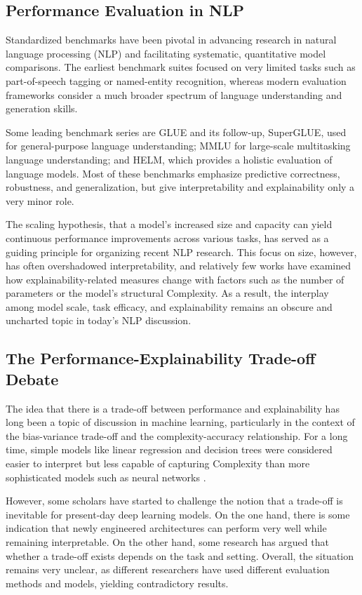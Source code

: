 \documentclass[preprint,12pt]{elsarticle}
\begin{document}
\subsection{Performance Evaluation in NLP}

Standardized benchmarks have been pivotal in advancing research in natural language processing (NLP) and facilitating systematic, quantitative model comparisons. The earliest benchmark suites focused on very limited tasks such as part-of-speech tagging or named-entity recognition, whereas modern evaluation frameworks consider a much broader spectrum of language understanding and generation skills.

Some leading benchmark series are GLUE and its follow-up, SuperGLUE, used for general-purpose language understanding; MMLU for large-scale multitasking language understanding; and HELM, which provides a holistic evaluation of language models. Most of these benchmarks emphasize predictive correctness, robustness, and generalization, but give interpretability and explainability only a very minor role.

The scaling hypothesis, that a model's increased size and capacity can yield continuous performance improvements across various tasks, has served as a guiding principle for organizing recent NLP research. This focus on size, however, has often overshadowed interpretability, and relatively few works have examined how explainability-related measures change with factors such as the number of parameters or the model's structural Complexity. As a result, the interplay among model scale, task efficacy, and explainability remains an obscure and uncharted topic in today's NLP discussion.

\subsection{The Performance-Explainability Trade-off Debate}

The idea that there is a trade-off between performance and explainability has long been a topic of discussion in machine learning, particularly in the context of the bias-variance trade-off and the complexity-accuracy relationship. For a long time, simple models like linear regression and decision trees were considered easier to interpret but less capable of capturing Complexity than more sophisticated models such as neural networks \cite{linardatos2020explainable}.

However, some scholars have started to challenge the notion that a trade-off is inevitable for present-day deep learning models. On the one hand, there is some indication that newly engineered architectures can perform very well while remaining interpretable. On the other hand, some research has argued that whether a trade-off exists depends on the task and setting. Overall, the situation remains very unclear, as different researchers have used different evaluation methods and models, yielding contradictory results.
\end{document}
